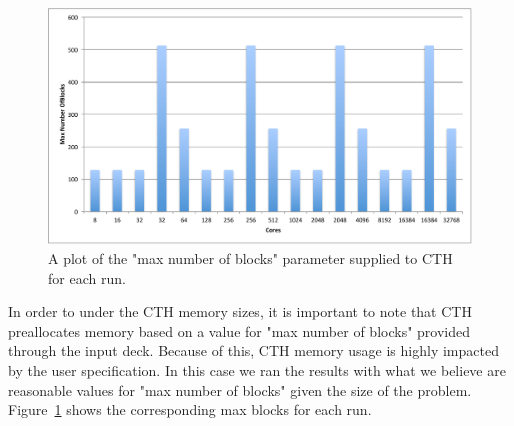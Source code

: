 \begin{figure}[htb]
  \centering
  \includegraphics[width=\linewidth]{figures/MaxNumberOfBlocks.pdf}
  \caption{A plot of the "max number of blocks" parameter supplied to CTH for each run.}
  \label{fig:MaxBlocks}
\end{figure}

In order to under the CTH memory sizes, it is important to note that CTH
preallocates memory based on a value for "max number of blocks" provided
through the input deck.  Because of this, CTH memory usage is highly impacted
by the user specification.  In this case we ran the results with what we
believe are reasonable values for "max number of blocks" given the size of the
problem.  Figure~\ref{fig:MaxBlocks} shows the corresponding max blocks for
each run.


